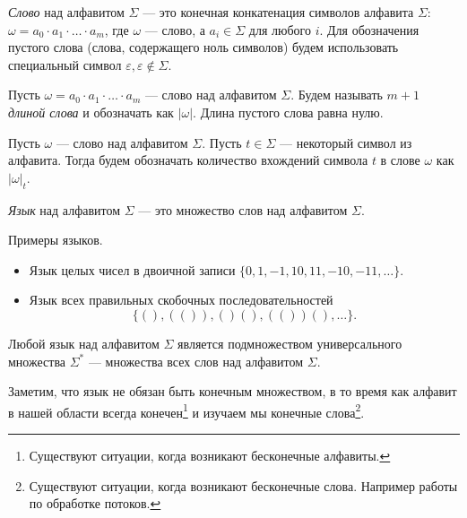 \begin{definition}
\textit{Слово} над алфавитом $\Sigma$ --- это конечная конкатенация символов алфавита $\Sigma$: $\omega = a_0 \cdot a_1 \cdot \ldots \cdot a_m$, где $\omega$ --- слово, а $a_i \in \Sigma$ для любого $i$.
Для обозначения пустого слова (слова, содержащего ноль символов) будем использовать специальный символ $\varepsilon, \varepsilon \notin \Sigma$.
\end{definition}

\begin{definition}
Пусть $\omega = a_0 \cdot a_1 \cdot \ldots \cdot a_m$ --- слово над алфавитом $\Sigma$.
Будем называть $m + 1$ \textit{длиной слова} и обозначать как $|\omega|$. Длина пустого слова равна нулю.
\end{definition}

\begin{definition}
  Пусть $\omega$ --- слово над алфавитом $\Sigma$. Пусть $t \in \Sigma$ --- некоторый символ из алфавита.
  Тогда будем обозначать количество вхождений символа $t$ в слове $\omega$ как $|\omega|_t$.
  \end{definition}
  

\begin{definition}
\textit{Язык} над алфавитом $\Sigma$ --- это множество слов над алфавитом $\Sigma$.
\end{definition}

\begin{example}

Примеры языков.

  \begin{itemize}
    \item Язык целых чисел в двоичной записи $\{0, 1, -1, 10, 11, -10, -11, \dots\}.$
    \item Язык всех правильных скобочных последовательностей $$\{(), (()), ()(), (())(), \dots\}.$$
  \end{itemize}
\end{example}

Любой язык над алфавитом $\Sigma$ является подмножеством универсального множества $\Sigma^*$ --- множества всех слов над алфавитом $\Sigma$.

Заметим, что язык не обязан быть конечным множеством, в то время как алфавит в нашей области всегда конечен\footnote{Существуют ситуации, когда возникают бесконечные алфавиты.} и изучаем мы конечные слова\footnote{Существуют ситуации, когда возникают бесконечные слова. Например работы по обработке потоков.}.

